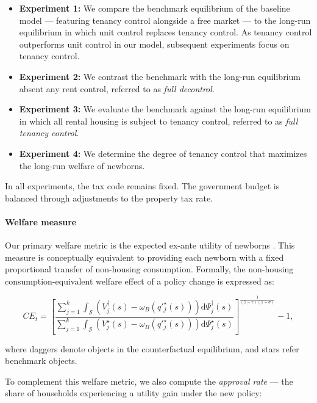 \documentclass[parskip=full]{article}
\begin{document}
\begin{itemize}
    \item \textbf{Experiment 1:} We compare the benchmark equilibrium of the baseline model — featuring tenancy control alongside a free market — to the long-run equilibrium in which unit control replaces tenancy control. As tenancy control outperforms unit control in our model, subsequent experiments focus on tenancy control.
    \item \textbf{Experiment 2:} We contrast the benchmark with the long-run equilibrium absent any rent control, referred to as \textit{full decontrol}.
    \item \textbf{Experiment 3:} We evaluate the benchmark against the long-run equilibrium in which all rental housing is subject to tenancy control, referred to as \textit{full tenancy control}.
    \item \textbf{Experiment 4:} We determine the degree of tenancy control that maximizes the long-run welfare of newborns.
\end{itemize}

In all experiments, the tax code remains fixed. The government budget is balanced through adjustments to the property tax rate.

\paragraph{Welfare measure} Our primary welfare metric is the expected ex-ante utility of newborns \citep{ralws-1971,conesa-et-al,gkkoc}. This measure is conceptually equivalent to providing each newborn with a fixed proportional transfer of non-housing consumption. Formally, the non-housing consumption-equivalent welfare effect of a policy change is expressed as:

\begin{equation}
  CE_{t} = \left[\frac{\sum_{j=1}^{k}\int_{\mathcal{S}}\left(V^{\dagger}_{j}(s)-\omega_{B}\left(q'^{\star}_{j}(s)\right)\right)\mathrm{d}\Psi^{\dagger}_{j}(s)}{\sum_{j=1}^{k}\int_{\mathcal{S}}\left(V^{\star}_{j}(s)-\omega_{B}\left(q'^{\star}_{j}(s)\right)\right)\mathrm{d}\Psi^{\star}_{j}(s)}\right]^{\frac{1}{(1-\gamma)(1-\sigma)}}-1,
\end{equation}

\noindent where daggers denote objects in the counterfactual equilibrium, and stars refer benchmark objects. 

To complement this welfare metric, we also compute the \textit{approval rate} — the share of households experiencing a utility gain under the new policy:
\end{document}
